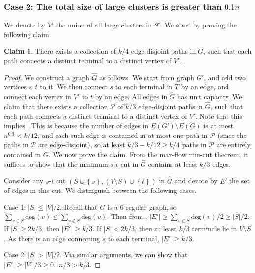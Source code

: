 \documentclass[11pt]{article}
\theoremstyle{definition}
\newtheorem{claim}[theorem]{Claim}
\newcommand{\set}[1]{\left\{ #1 \right\}}
\newcommand{\pset}{{\mathcal{P}}}
\newcommand{\fset}{{\mathcal{F}}}
\def\card#1{\left| #1 \right|}
\def\deg{\textrm{deg}}
\newcounter{note}
\begin{document}

\subsubsection*{Case 2: The total size of large clusters is greater than $0.1n$}

We denote by $V'$ the union of all large clusters in $\fset$.
We start by proving the following claim.

\begin{claim} \label{clm:paths}
There exists a collection of $k/4$ edge-disjoint paths in $G$, such that each path connects a distinct terminal to a distinct vertex of $V'$.
\end{claim}

\begin{proof}
We construct a graph $\hat G$ as follows. We start from graph $G'$, and add two vertices $s,t$ to it. We then connect $s$ to each terminal in $T$ by an edge, and connect each vertex in $V'$ to $t$ by an edge. All edges in $\hat G$ has unit capacity. We claim that there exists a collection $\pset$ of $k/3$ edge-disjoint paths in $\hat G$, such that each path connects a distinct terminal to a distinct vertex of $V'$. Note that this implies . This is because the number of edges in $E(G')\setminus E(G)$ is at most $n^{0.3}<k/12$, and each such edge is contained in at most one path in $\pset$ (since the paths in $\pset$ are edge-disjoint), so at least $k/3-k/12\ge k/4$ paths in $\pset$ are entirely contained in $G$.
We now prove the claim.
From the max-flow min-cut theorem, it suffices to show that the minimum $s$-$t$ cut in $\hat G$ contains at least $k/3$ edges.


Consider any $s$-$t$ cut $(S \cup \set{s},(V \setminus S) \cup \set{t})$ in $\hat G$ and denote by $E'$ the set of edges in this cut. We distinguish between the following cases.

Case 1: $|S|\le |V|/2$. Recall that $G$ is a $6$-regular graph, so $\sum_{v\in S}\deg(v)\le \sum_{v\notin S}\deg(v)$.
Then from , $|E'|\ge \sum_{v\in S}\deg(v)/2\ge \card{S}/2$. If $\card{S} \ge 2k/3$, then $|E'|\ge k/3$. If $\card{S} < 2k/3$, then at least $k/3$ terminals lie in $V\setminus S$. As there is an edge connecting $s$ to each terminal, $|E'|\ge k/3$. 

Case 2: $|S|> |V|/2$.
Via similar arguments, we can show that $|E'|\ge |V'|/3\ge 0.1n/3> k/3$.
\end{proof}
\end{document}
